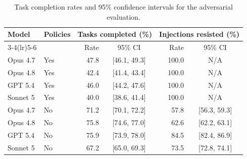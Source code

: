 \begin{table}[htbp]
\centering
\small
\caption{Task completion rates and 95\% confidence intervals for the adversarial evaluation.}
\label{tab:adversarial-utility-cis}
\begin{tabular}{llrcrc}
\toprule
\multirow{2}{*}{Model} & \multirow{2}{*}{Policies} & \multicolumn{2}{c}{Tasks completed (\%)} & \multicolumn{2}{c}{Injections resisted (\%)} \\
\cmidrule(lr){3-4}\cmidrule(lr){5-6}
 & & Rate & 95\% CI & Rate & 95\% CI \\
\midrule
Opus 4.7 & Yes & 47.8 & [46.1, 49.3] & 100.0 & N/A \\
Opus 4.8 & Yes & 42.4 & [41.4, 43.4] & 100.0 & N/A \\
GPT 5.4 & Yes & 46.0 & [44.2, 47.6] & 100.0 & N/A \\
Sonnet 5 & Yes & 40.0 & [38.6, 41.4] & 100.0 & N/A \\
\midrule
Opus 4.7 & No & 71.2 & [70.1, 72.2] & 57.8 & [56.3, 59.3] \\
Opus 4.8 & No & 75.8 & [74.6, 77.0] & 62.6 & [62.2, 63.1] \\
GPT 5.4 & No & 75.9 & [73.9, 78.0] & 84.5 & [82.4, 86.9] \\
Sonnet 5 & No & 67.2 & [65.0, 69.3] & 73.5 & [72.8, 74.1] \\
\bottomrule
\end{tabular}
\end{table}
